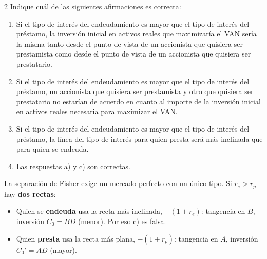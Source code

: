 \documentclass[10pt,a4paper,twoside]{article}
\newenvironment{opciones}{\begin{enumerate}[label={\sffamily\bfseries\color{steel}\alph*)},
  leftmargin=1.6em,itemsep=1pt,topsep=2pt]}{\end{enumerate}}
\begin{document}
\begin{enunciado}{2}
Indique cuál de las siguientes afirmaciones es correcta:
\begin{opciones}
  \item Si el tipo de interés del endeudamiento es mayor que el tipo de interés del préstamo, la inversión inicial en
        activos reales que maximizaría el VAN sería la misma tanto desde el punto de vista de un accionista que quisiera
        ser prestamista como desde el punto de vista de un accionista que quisiera ser prestatario.
  \item Si el tipo de interés del endeudamiento es mayor que el tipo de interés del préstamo, un accionista que
        quisiera ser prestamista y otro que quisiera ser prestatario no estarían de acuerdo en cuanto al importe de la
        inversión inicial en activos reales necesaria para maximizar el VAN.
  \item Si el tipo de interés del endeudamiento es mayor que el tipo de interés del préstamo, la línea del tipo de
        interés para quien presta será más inclinada que para quien se endeuda.
  \item Las respuestas a) y c) son correctas.
\end{opciones}
\end{enunciado}

La separación de Fisher exige un mercado perfecto con un único tipo. Si $r_e>r_p$ hay \textbf{dos rectas}:
\begin{itemize}
  \item Quien se \textbf{endeuda} usa la recta más inclinada, $-(1+r_e)$: tangencia en $B$, inversión $C_0=BD$ (menor).
        Por eso c) es falsa.
  \item Quien \textbf{presta} usa la recta más plana, $-(1+r_p)$: tangencia en $A$, inversión $C_0'=AD$ (mayor).
\end{itemize}

\begin{center}
\end{center}
\end{document}

